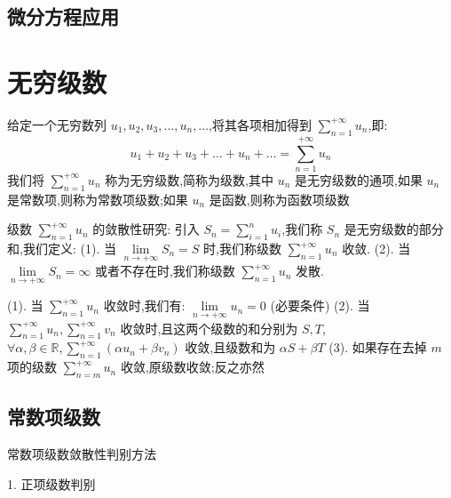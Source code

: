 \section{微分方程应用}
\chapter{无穷级数}

\begin{definition}
	给定一个无穷数列 $u_{1},u_{2},u_{3},\dots,u_{n},\dots$,将其各项相加得到 $\sum\limits_{n=1}^{+\infty}u_{n}$,即:
	$$u_{1}+u_{2}+u_{3}+\dots+u_{n}+\dots=\sum_{n=1}^{+\infty}u_{n}$$
	我们将 $\sum\limits_{n=1}^{+\infty}u_{n}$ 称为无穷级数,简称为级数,其中 $u_{n}$ 是无穷级数的通项,如果 $u_{n}$ 是常数项,则称为常数项级数;如果 $u_{n}$ 是函数,则称为函数项级数
\end{definition}
\begin{definition}[级数敛散性]
	级数 $\sum\limits_{n=1}^{+\infty}u_{n}$ 的敛散性研究:
	引入 $S_{n}=\sum\limits_{i=1}^{n}u_{i}$,我们称 $S_{n}$ 是无穷级数的部分和,我们定义:
	(1). 当 $\lim\limits_{n\rightarrow +\infty}S_{n}=S$ 时,我们称级数 $\sum\limits_{n=1}^{+\infty}u_{n}$ 收敛.
	(2). 当 $\lim\limits_{n\rightarrow +\infty}S_{n}=\infty$ 或者不存在时,我们称级数 $\sum\limits_{n=1}^{+\infty}u_{n}$ 发散.
\end{definition}
\begin{corollary}
	(1). 当 $\sum\limits_{n=1}^{+\infty}u_{n}$ 收敛时,我们有:  $\lim\limits_{n\rightarrow +\infty}u_{n}=0$ (必要条件)
	(2). 当 $\sum\limits_{n=1}^{+\infty}u_{n},\sum\limits_{n=1}^{+\infty}v_{n}$ 收敛时,且这两个级数的和分别为 $S,T$, $\forall \alpha ,\beta \in \mathbb{R} ,\sum\limits_{n=1}^{+\infty}(\alpha u_{n}+\beta v_{n})$ 收敛,且级数和为 $\alpha S+\beta T$
	(3). 如果存在去掉 $m$ 项的级数 $\sum\limits_{n=m}^{+\infty}u_{n}$ 收敛,原级数收敛;反之亦然
\end{corollary}
\section{常数项级数}

常数项级数敛散性判别方法

1. 正项级数判别

